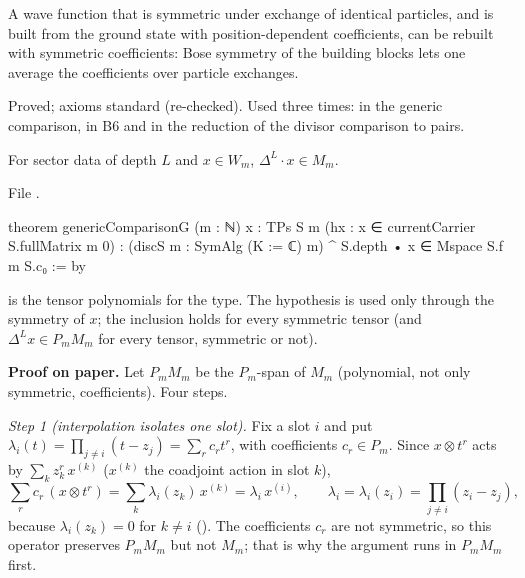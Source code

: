 \begin{physics}
A wave function that is symmetric under exchange of identical particles, and is built from the ground state with
position-dependent coefficients, can be rebuilt with symmetric coefficients: Bose symmetry of the building blocks lets one
average the coefficients over particle exchanges.
\end{physics}

\begin{status}
Proved; axioms standard (re-checked). Used three times: in the generic comparison, in B6 and in the reduction of the divisor
comparison to pairs.
\end{status}

\begin{theorem}\label{l24:thm:generic}
For sector data of depth $L$ and $x\in W_m$, $\Delta^L\cdot x\in M_m$.
\end{theorem}
\noindent File .
\begin{leancode}
theorem genericComparisonG (m : ℕ) {x : TPs S m} (hx : x ∈ currentCarrier S.fullMatrix m 0) :
    (discS m : SymAlg (K := ℂ) m) ^ S.depth • x ∈ Mspace S.f m S.c₀ := by
\end{leancode}

\begin{dictionary}
 is the tensor polynomials for the type. The hypothesis  is used only through the symmetry
of $x$; the inclusion holds for every symmetric tensor (and $\Delta^Lx\in P_mM_m$ for every tensor, symmetric or not).
\end{dictionary}

\textbf{Proof on paper.} Let $P_mM_m$ be the $P_m$-span of $M_m$ (polynomial, not only symmetric, coefficients). Four steps.

\emph{Step 1 (interpolation isolates one slot).} Fix a slot $i$ and put $\lambda_i(t)=\prod_{j\neq i}(t-z_j)=\sum_rc_rt^r$, with
coefficients $c_r\in P_m$. Since $x\otimes t^r$ acts by $\sum_kz_k^r\,x^{(k)}$ ($x^{(k)}$ the coadjoint action in slot $k$),
\begin{equation*}
\sum_rc_r\,(x\otimes t^r)=\sum_k\lambda_i(z_k)\,x^{(k)}=\lambda_i\,x^{(i)},\qquad \lambda_i=\lambda_i(z_i)=\prod_{j\neq i}(z_i-z_j),
\end{equation*}
because $\lambda_i(z_k)=0$ for $k\neq i$ (). The coefficients $c_r$ are not symmetric, so this operator preserves
$P_mM_m$ but not $M_m$; that is why the argument runs in $P_mM_m$ first.


